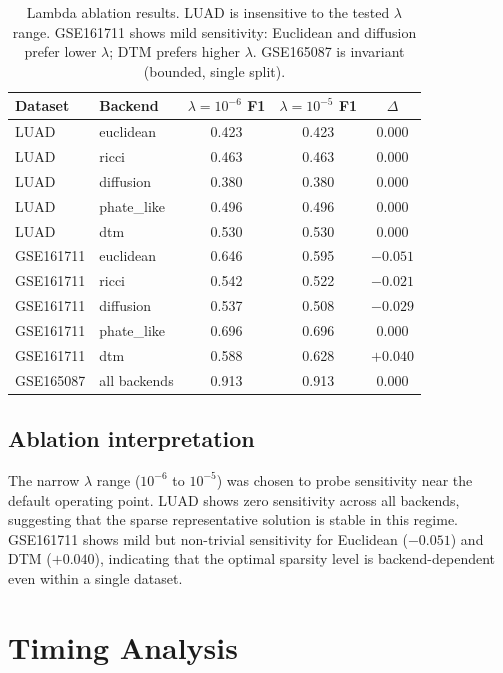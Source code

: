 \documentclass[11pt]{article}
\begin{document}
\begin{table}[h]
\centering
\small
\begin{tabular}{llccc}
\toprule
Dataset & Backend & $\lambda = 10^{-6}$ F1 & $\lambda = 10^{-5}$ F1 & $\Delta$ \\
\midrule
LUAD & euclidean & 0.423 & 0.423 & 0.000 \\
LUAD & ricci & 0.463 & 0.463 & 0.000 \\
LUAD & diffusion & 0.380 & 0.380 & 0.000 \\
LUAD & phate\_like & 0.496 & 0.496 & 0.000 \\
LUAD & dtm & 0.530 & 0.530 & 0.000 \\
\midrule
GSE161711 & euclidean & 0.646 & 0.595 & $-0.051$ \\
GSE161711 & ricci & 0.542 & 0.522 & $-0.021$ \\
GSE161711 & diffusion & 0.537 & 0.508 & $-0.029$ \\
GSE161711 & phate\_like & 0.696 & 0.696 & 0.000 \\
GSE161711 & dtm & 0.588 & 0.628 & $+0.040$ \\
\midrule
GSE165087 & all backends & 0.913 & 0.913 & 0.000 \\
\bottomrule
\end{tabular}
\caption{Lambda ablation results.
LUAD is insensitive to the tested $\lambda$ range.
GSE161711 shows mild sensitivity: Euclidean and diffusion prefer lower $\lambda$; DTM prefers higher $\lambda$.
GSE165087 is invariant (bounded, single split).}
\label{tab:ablation_full}
\end{table}

\subsection{Ablation interpretation}
The narrow $\lambda$ range ($10^{-6}$ to $10^{-5}$) was chosen to probe sensitivity near the default operating point.
LUAD shows zero sensitivity across all backends, suggesting that the sparse representative solution is stable in this regime.
GSE161711 shows mild but non-trivial sensitivity for Euclidean ($-0.051$) and DTM ($+0.040$), indicating that the optimal sparsity level is backend-dependent even within a single dataset.

\section{Timing Analysis}
\label{sec:timing}
\end{document}
